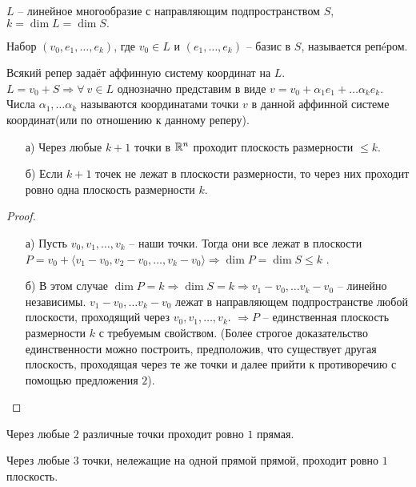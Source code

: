 $L$ -- линейное многообразие с направляющим подпространством $S$, $k = \dim L = \dim S .$
\begin{Def}
	Набор $(v_0, e_1, \ldots, e_k)$,  где $v_0 \in L$ и $(e_1, \ldots, e_k)$ -- базис в $S$, называется репéром.
\end{Def}

Всякий репер задаёт аффинную систему координат на $L$. \\
$L = v_0 + S \Rightarrow \forall ~ v \in L$ однозначно представим в виде $v = v_0 + \alpha_1 e_1 + \ldots \alpha_k e_k$.
Числа $\alpha_1, \ldots \alpha_k$ называются координатами точки $v$ в данной аффинной системе координат(или по
отношению к данному реперу).

\begin{theorem}
	\begin{enumerate}
		\item[{а)}] Через любые $k + 1$ точки в $\mathbb{R}^n$ проходит плоскость размерности $\leq k$.
		\item[{б)}] Если $k + 1$ точек не лежат в плоскости размерности, то через них проходит ровно одна плоскость размерности $k$.
	\end{enumerate}
\end{theorem}
\begin{proof}
	\begin{enumerate}
		\item[{а)}] Пусть $v_0, v_1, \ldots, v_k$ -- наши точки. Тогда они все лежат в плоскости 
						$P = v_0 + \langle v_1 - v_0, v_2 - v_0, \ldots, v_k - v_0 \rangle \Rightarrow \dim P = \dim S \leq k$ .
		\item[{б)}] В этом случае $\dim P = k \Rightarrow \dim S = k \Rightarrow v_1 - v_0, \ldots v_k - v_0$ -- линейно независимы.
						$v_1 - v_0, \ldots v_k - v_0$ лежат в направляющем подпространстве любой плоскости, проходящий через
						$v_0, v_1, \dots, v_k$. $\Rightarrow P$ -- единственная плоскость размерности $k$ с требуемым свойством.
						(Более строгое доказательство единственности можно построить, предположив, что существует другая плоскость,
						проходящая через те же точки и далее прийти к противоречию с помощью предложения $2$).
	\end{enumerate}
\end{proof}

\begin{sl1}
	Через любые  $2$ различные точки проходит ровно $1$ прямая.
\end{sl1}
\begin{sl2}
	Через любые $3$ точки, нележащие на одной прямой прямой, проходит ровно $1$ плоскость.
\end{sl2}


